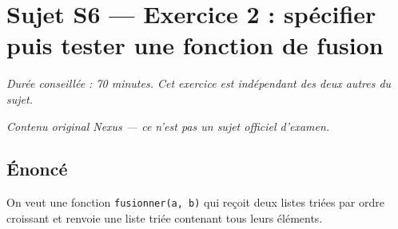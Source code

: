 \section*{Sujet S6 --- Exercice 2 : spécifier puis tester une fonction de fusion}

\textit{Durée conseillée : 70 minutes. Cet exercice est indépendant des deux
autres du sujet.}

\medskip
\textit{Contenu original Nexus --- ce n'est pas un sujet officiel d'examen.}

\subsection*{Énoncé}

On veut une fonction \lstinline{fusionner(a, b)} qui reçoit deux listes triées
par ordre croissant et renvoie une liste triée contenant tous leurs éléments.

